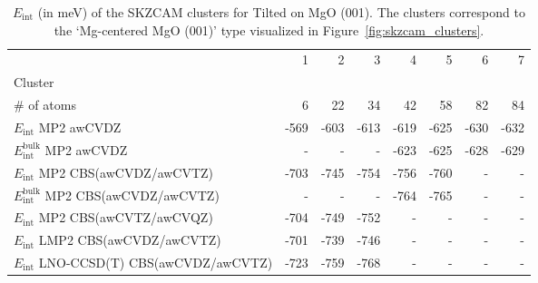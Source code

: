 \begin{table}
\caption{\label{tab:system_eint_mgo_ch3oh_tilted}$E_\textrm{int}$ (in meV) of the SKZCAM clusters for Tilted  on MgO (001). The clusters correspond to the `Mg-centered MgO (001)' type visualized in Figure~\ref{fig:skzcam_clusters}.}
\begin{adjustbox}{center,max width=1.4\textwidth}
\begin{tabular}{lrrrrrrr}
\toprule
 & 1 & 2 & 3 & 4 & 5 & 6 & 7 \\ 
Cluster &  &  &  &  &  &  &  \\
\midrule
\# of atoms & 6 & 22 & 34 & 42 & 58 & 82 & 84 \\
$E_\textrm{int}$ MP2 awCVDZ & -569 & -603 & -613 & -619 & -625 & -630 & -632 \\
$E_\textrm{int}^\textrm{bulk}$ MP2 awCVDZ & - & - & - & -623 & -625 & -628 & -629 \\
$E_\textrm{int}$ MP2 CBS(awCVDZ/awCVTZ) & -703 & -745 & -754 & -756 & -760 & - & - \\
$E_\textrm{int}^\textrm{bulk}$ MP2 CBS(awCVDZ/awCVTZ) & - & - & - & -764 & -765 & - & - \\
$E_\textrm{int}$ MP2 CBS(awCVTZ/awCVQZ) & -704 & -749 & -752 & - & - & - & - \\
$E_\textrm{int}$ LMP2 CBS(awCVDZ/awCVTZ) & -701 & -739 & -746 & - & - & - & - \\
$E_\textrm{int}$ LNO-CCSD(T) CBS(awCVDZ/awCVTZ) & -723 & -759 & -768 & - & - & - & - \\
\bottomrule
\end{tabular}
\end{adjustbox}
\end{table}

